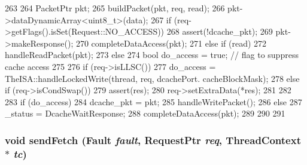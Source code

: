 \begin{DoxyCode}
263 {
264     PacketPtr pkt;
265     buildPacket(pkt, req, read);
266     pkt->dataDynamicArray<uint8_t>(data);
267     if (req->getFlags().isSet(Request::NO_ACCESS)) {
268         assert(!dcache_pkt);
269         pkt->makeResponse();
270         completeDataAccess(pkt);
271     } else if (read) {
272         handleReadPacket(pkt);
273     } else {
274         bool do_access = true;  // flag to suppress cache access
275 
276         if (req->isLLSC()) {
277             do_access = TheISA::handleLockedWrite(thread, req, dcachePort.
      cacheBlockMask);
278         } else if (req->isCondSwap()) {
279             assert(res);
280             req->setExtraData(*res);
281         }
282 
283         if (do_access) {
284             dcache_pkt = pkt;
285             handleWritePacket();
286         } else {
287             _status = DcacheWaitResponse;
288             completeDataAccess(pkt);
289         }
290     }
291 }
\end{DoxyCode}
\hypertarget{classTimingSimpleCPU_a9c1e81509746ac06253e334c436e1a75}{
\subsubsection[{sendFetch}]{\setlength{\rightskip}{0pt plus 5cm}void sendFetch ({\bf Fault} {\em fault}, \/  {\bf RequestPtr} {\em req}, \/  {\bf ThreadContext} $\ast$ {\em tc})}}
\label{classTimingSimpleCPU_a9c1e81509746ac06253e334c436e1a75}



